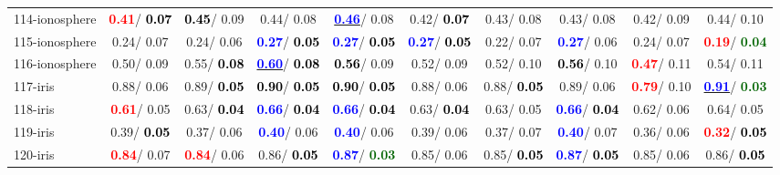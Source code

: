 \begin{table}[h]
\begin{center}
{\begin{tabular}{lc|c|c|c|c|c|c|c|c}
114-ionosphere & \textcolor{red}{\textbf{  0.41}}/\textcolor{black}{\textbf{  0.07}} & \textcolor{black}{\textbf{  0.45}}/  0.09 &   0.44/  0.08 & \underline{\textcolor{blue}{\textbf{  0.46}}}/  0.08 &   0.42/\textcolor{black}{\textbf{  0.07}} &   0.43/  0.08 &   0.43/  0.08 &   0.42/  0.09 &   0.44/  0.10 \\
115-ionosphere &   0.24/  0.07 &   0.24/  0.06 & \textcolor{blue}{\textbf{  0.27}}/\textcolor{black}{\textbf{  0.05}} & \textcolor{blue}{\textbf{  0.27}}/\textcolor{black}{\textbf{  0.05}} & \textcolor{blue}{\textbf{  0.27}}/\textcolor{black}{\textbf{  0.05}} &   0.22/  0.07 & \textcolor{blue}{\textbf{  0.27}}/  0.06 &   0.24/  0.07 & \textcolor{red}{\textbf{  0.19}}/\textcolor{darkgreen}{\textbf{  0.04}} \\
116-ionosphere &   0.50/  0.09 &   0.55/\textcolor{black}{\textbf{  0.08}} & \underline{\textcolor{blue}{\textbf{  0.60}}}/\textcolor{black}{\textbf{  0.08}} & \textcolor{black}{\textbf{  0.56}}/  0.09 &   0.52/  0.09 &   0.52/  0.10 & \textcolor{black}{\textbf{  0.56}}/  0.10 & \textcolor{red}{\textbf{  0.47}}/  0.11 &   0.54/  0.11 \\
117-iris &   0.88/  0.06 &   0.89/\textcolor{black}{\textbf{  0.05}} & \textcolor{black}{\textbf{  0.90}}/\textcolor{black}{\textbf{  0.05}} & \textcolor{black}{\textbf{  0.90}}/\textcolor{black}{\textbf{  0.05}} &   0.88/  0.06 &   0.88/\textcolor{black}{\textbf{  0.05}} &   0.89/  0.06 & \textcolor{red}{\textbf{  0.79}}/  0.10 & \underline{\textcolor{blue}{\textbf{  0.91}}}/\textcolor{darkgreen}{\textbf{  0.03}} \\ \hline
118-iris & \textcolor{red}{\textbf{  0.61}}/  0.05 &   0.63/\textcolor{black}{\textbf{  0.04}} & \textcolor{blue}{\textbf{  0.66}}/\textcolor{black}{\textbf{  0.04}} & \textcolor{blue}{\textbf{  0.66}}/\textcolor{black}{\textbf{  0.04}} &   0.63/\textcolor{black}{\textbf{  0.04}} &   0.63/  0.05 & \textcolor{blue}{\textbf{  0.66}}/\textcolor{black}{\textbf{  0.04}} &   0.62/  0.06 &   0.64/  0.05 \\
119-iris &   0.39/\textcolor{black}{\textbf{  0.05}} &   0.37/  0.06 & \textcolor{blue}{\textbf{  0.40}}/  0.06 & \textcolor{blue}{\textbf{  0.40}}/  0.06 &   0.39/  0.06 &   0.37/  0.07 & \textcolor{blue}{\textbf{  0.40}}/  0.07 &   0.36/  0.06 & \textcolor{red}{\textbf{  0.32}}/\textcolor{black}{\textbf{  0.05}} \\
120-iris & \textcolor{red}{\textbf{  0.84}}/  0.07 & \textcolor{red}{\textbf{  0.84}}/  0.06 &   0.86/\textcolor{black}{\textbf{  0.05}} & \textcolor{blue}{\textbf{  0.87}}/\textcolor{darkgreen}{\textbf{  0.03}} &   0.85/  0.06 &   0.85/\textcolor{black}{\textbf{  0.05}} & \textcolor{blue}{\textbf{  0.87}}/\textcolor{black}{\textbf{  0.05}} &   0.85/  0.06 &   0.86/\textcolor{black}{\textbf{  0.05}} \\

\end{tabular}}
\end{center}
\end{table}
